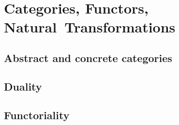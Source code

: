 \chapter{Categories, Functors, Natural~Transformations}

\section{Abstract and concrete categories}




\section{Duality}








\section{Functoriality}



